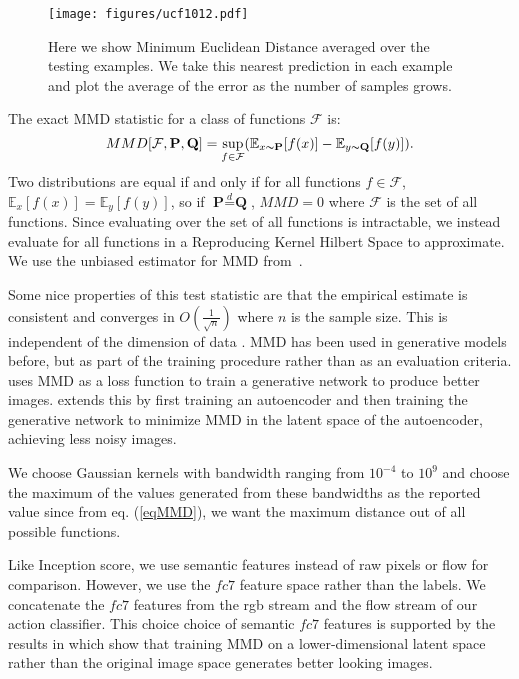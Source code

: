  \begin{figure}[t!]
\centering
\texttt{[image: figures/ucf1012.pdf]} 
\caption{Here we show Minimum Euclidean Distance averaged over the testing examples. We take this nearest prediction in each example and plot the average of the error as the number of samples grows.}
\label{fig:EuclideanErrorUCF101}
\end{figure}

The exact MMD statistic for a class of functions $\mathcal{F}$ is:
\begin{equation}
\label{eqMMD}
MMD[\mathcal{F}, \textbf{P}, \textbf{Q}] = \underset{f \in \mathcal F}{\sup}(\mathbb{E}_{x \thicksim \textbf{P}}[f(x)]-\mathbb{E}_{y \thicksim \textbf{Q}}[f(y)]).
\end{equation}
Two distributions are equal if and only if for all functions $f \in \mathcal F$, $\mathbb{E}_x[f(x)]=\mathbb{E}_y[f(y)]$, so if $\textbf{P} \overset{d}{=} \textbf{Q}$, $MMD = 0$ where $\mathcal{F}$ is the set of all functions. Since evaluating over the set of all functions is intractable, we instead evaluate for all functions in a Reproducing Kernel Hilbert Space to approximate. We use the unbiased estimator for MMD from~\cite{Gretton14}.

Some nice properties of this test statistic are that the empirical estimate is consistent and converges in $O(\frac{1}{\sqrt n})$ where $n$ is the sample size. This is independent of the dimension of data \cite{Gretton14}. MMD has been used in generative models before, but as part of the training procedure rather than as an evaluation criteria. \cite{Dziugaite15} uses MMD as a loss function to train a generative network to produce better images. \cite{Li15} extends this by first training an autoencoder and then training the generative network to minimize MMD in the latent space of the autoencoder, achieving less noisy images.

We choose Gaussian kernels with bandwidth ranging from $10^{-4}$ to $10^9$ and choose the maximum of the values generated from these bandwidths as the reported value since from eq. (\ref{eqMMD}), we want the maximum distance out of all possible functions.

 Like Inception score, we use semantic features instead of raw pixels or flow for comparison. However, we use the $fc7$ feature space rather than the labels. We concatenate the $fc7$ features from the rgb stream and the flow stream of our action classifier.  This choice choice of semantic $fc7$ features is supported by the results in \cite{Li15} which show that training MMD on a lower-dimensional latent space rather than the original image space generates better looking images.
 
